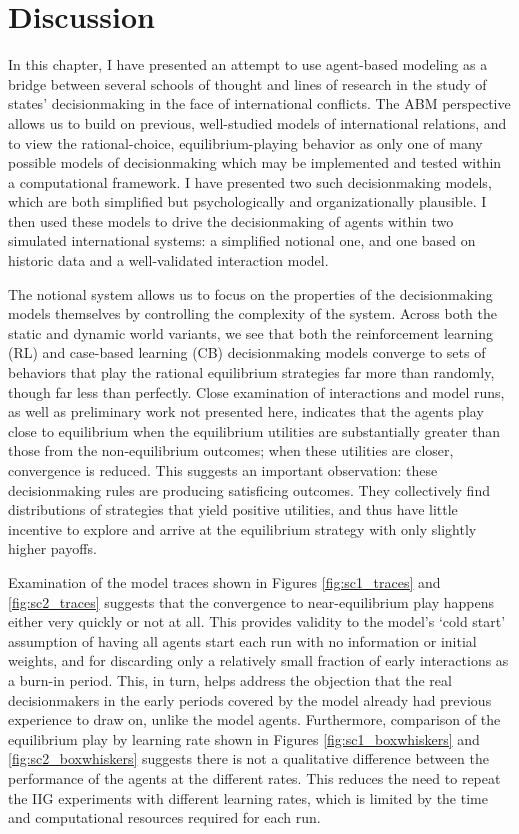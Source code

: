 \section{Discussion}\label{discussion}

In this chapter, I have presented an attempt to use agent-based modeling as a bridge between several schools of thought and lines of research in the study of states' decisionmaking in the face of international conflicts. The ABM perspective allows us to build on previous, well-studied models of international relations, and to view the rational-choice, equilibrium-playing behavior as only one of many possible models of decisionmaking which may be implemented and tested within a computational framework. I have presented two such decisionmaking models, which are both simplified but psychologically and organizationally plausible. I then used these models to drive the decisionmaking of agents within two simulated international systems: a simplified notional one, and one based on historic data and a well-validated interaction model.

The notional system allows us to focus on the properties of the decisionmaking models themselves by controlling the complexity of the system. Across both the static and dynamic world variants, we see that both the reinforcement learning (RL) and case-based learning (CB) decisionmaking models converge to sets of behaviors that play the rational equilibrium strategies far more than randomly, though far less than perfectly. Close examination of interactions and model runs, as well as preliminary work not presented here, indicates that the agents play close to equilibrium when the equilibrium utilities are substantially greater than those from the non-equilibrium outcomes; when these utilities are closer, convergence is reduced. This suggests an important observation: these decisionmaking rules are producing satisficing outcomes. They collectively find distributions of strategies that yield positive utilities, and thus have little incentive to explore and arrive at the equilibrium strategy with only slightly higher payoffs. 

Examination of the model traces shown in Figures \ref{fig:sc1_traces} and \ref{fig:sc2_traces} suggests that the convergence to near-equilibrium play happens either very quickly or not at all. This provides validity to the model's `cold start' assumption of having all agents start each run with no information or initial weights, and for discarding only a relatively small fraction of early interactions as a burn-in period. This, in turn, helps address the objection that the real decisionmakers in the early periods covered by the model already had previous experience to draw on, unlike the model agents. Furthermore, comparison of the equilibrium play by learning rate shown in Figures \ref{fig:sc1_boxwhiskers} and \ref{fig:sc2_boxwhiskers} suggests there is not a qualitative difference between the performance of the agents at the different rates. This reduces the need to repeat the IIG experiments with different learning rates, which is limited by the time and computational resources required for each run.

